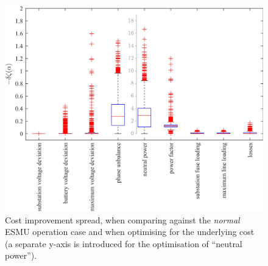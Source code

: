 \begin{figure}\centering
	\includegraphics[width=\textwidth]{_chapter1/fig/results/boxplot-overall-improvements}
\caption{Cost improvement spread, when comparing against the \textit{normal} ESMU operation case and when optimising for the underlying cost (a separate y-axis is introduced for the optimisation of ``neutral power'').}
\label{ch1:fig:boxplot-overall-improvements}
\end{figure}